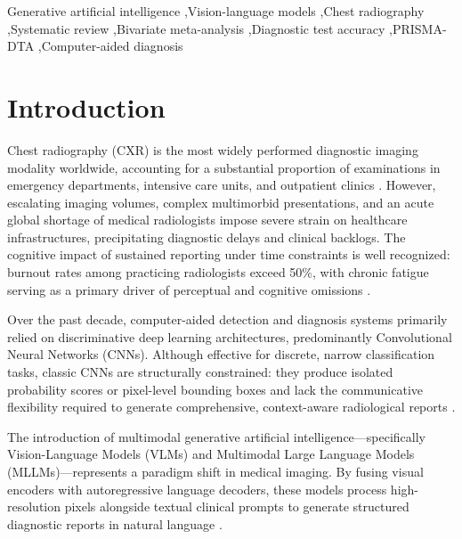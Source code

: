 \documentclass[preprint,11pt]{elsarticle}
\begin{document}
\begin{frontmatter}
\begin{abstract}
\noindent \textbf{Conclusion:} Current evidence advises against autonomous generative AI deployment for diagnostic rule-out triage in chest radiography due to substantial sensitivity collapse in small lesions and broad prediction intervals (6.4\%--99.5\%). Conversely, deployment as an assisted second reader under mandatory human radiological oversight is supported by documented workflow acceleration (42\% time reduction) and high specificity.
\end{abstract}

\begin{keyword}
Generative artificial intelligence \sep Vision-language models \sep Chest radiography \sep Systematic review \sep Bivariate meta-analysis \sep Diagnostic test accuracy \sep PRISMA-DTA \sep Computer-aided diagnosis
\end{keyword}

\end{frontmatter}


\section{Introduction}
Chest radiography (CXR) is the most widely performed diagnostic imaging modality worldwide, accounting for a substantial proportion of examinations in emergency departments, intensive care units, and outpatient clinics \cite{vanginneken}. However, escalating imaging volumes, complex multimorbid presentations, and an acute global shortage of medical radiologists impose severe strain on healthcare infrastructures, precipitating diagnostic delays and clinical backlogs. The cognitive impact of sustained reporting under time constraints is well recognized: burnout rates among practicing radiologists exceed 50\%, with chronic fatigue serving as a primary driver of perceptual and cognitive omissions \cite{parikh}.

Over the past decade, computer-aided detection and diagnosis systems primarily relied on discriminative deep learning architectures, predominantly Convolutional Neural Networks (CNNs). Although effective for discrete, narrow classification tasks, classic CNNs are structurally constrained: they produce isolated probability scores or pixel-level bounding boxes and lack the communicative flexibility required to generate comprehensive, context-aware radiological reports \cite{vanginneken}.

The introduction of multimodal generative artificial intelligence—specifically Vision-Language Models (VLMs) and Multimodal Large Language Models (MLLMs)—represents a paradigm shift in medical imaging. By fusing visual encoders with autoregressive language decoders, these models process high-resolution pixels alongside textual clinical prompts to generate structured diagnostic reports in natural language \cite{hong2025a,huang2025}.
\end{document}
